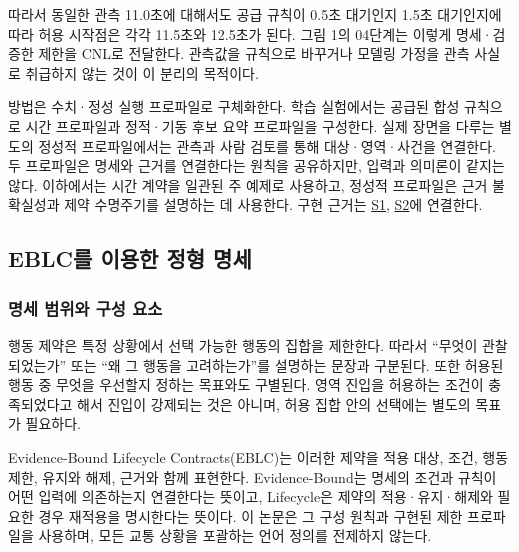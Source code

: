 \documentclass[10pt,a4paper,twocolumn]{article}\usepackage[margin=18mm]{geometry}\usepackage{fontspec,kotex}
\begin{document}
따라서 동일한 관측 11.0초에 대해서도 공급 규칙이 0.5초 대기인지 1.5초 대기인지에 따라 허용 시작점은 각각 11.5초와 12.5초가 된다. 그림 1의 04단계는 이렇게 명세·검증한 제한을 CNL로 전달한다. 관측값을 규칙으로 바꾸거나 모델링 가정을 관측 사실로 취급하지 않는 것이 이 분리의 목적이다.\par

방법은 수치·정성 실행 프로파일로 구체화한다. 학습 실험에서는 공급된 합성 규칙으로 시간 프로파일과 정적·기동 후보 요약 프로파일을 구성한다. 실제 장면을 다루는 별도의 정성적 프로파일에서는 관측과 사람 검토를 통해 대상·영역·사건을 연결한다. 두 프로파일은 명세와 근거를 연결한다는 원칙을 공유하지만, 입력과 의미론이 같지는 않다. 이하에서는 시간 계약을 일관된 주 예제로 사용하고, 정성적 프로파일은 근거 불확실성과 제약 수명주기를 설명하는 데 사용한다. 구현 근거는 \href{\detokenize{projects/04-guardsynth-coc/experiments/paper1_cnl_learning/temporal_preservation.py}}{S1}, \href{\detokenize{platforms/eblc-bcv/src/guard_synth_eblc/action_contract.py}}{S2}에 연결한다.\par

\subsection{EBLC를 이용한 정형 명세}

\subsubsection{명세 범위와 구성 요소}

행동 제약은 특정 상황에서 선택 가능한 행동의 집합을 제한한다. 따라서 “무엇이 관찰되었는가” 또는 “왜 그 행동을 고려하는가”를 설명하는 문장과 구분된다. 또한 허용된 행동 중 무엇을 우선할지 정하는 목표와도 구별된다. 영역 진입을 허용하는 조건이 충족되었다고 해서 진입이 강제되는 것은 아니며, 허용 집합 안의 선택에는 별도의 목표가 필요하다.\par

Evidence-Bound Lifecycle Contracts(EBLC)는 이러한 제약을 적용 대상, 조건, 행동 제한, 유지와 해제, 근거와 함께 표현한다. Evidence-Bound는 명세의 조건과 규칙이 어떤 입력에 의존하는지 연결한다는 뜻이고, Lifecycle은 제약의 적용·유지·해제와 필요한 경우 재적용을 명시한다는 뜻이다. 이 논문은 그 구성 원칙과 구현된 제한 프로파일을 사용하며, 모든 교통 상황을 포괄하는 언어 정의를 전제하지 않는다.\par
\end{document}
